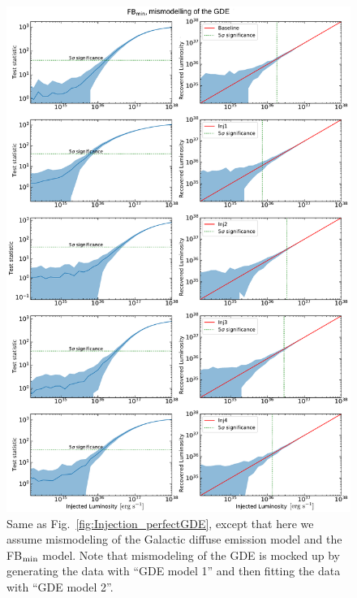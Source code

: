 \documentclass[doublespace,draft,nopageskip]{VTthesis} %
\begin{document}
\begin{figure}
    \begin{center}
    \includegraphics[scale = 0.42]{Figures/CTA/all-TS-mis-True-Fermi-min-True.pdf}
    \caption{Same as Fig.~\ref{fig:Injection_perfectGDE}, except that here we assume mismodeling of the Galactic diffuse emission model and the FB$_{\rm min}$ model. Note that mismodeling of the GDE is mocked up by generating the data with ``GDE model 1'' and then fitting the data with ``GDE model 2''. }\label{fig:InjectionmismodelingFBmin}
    \end{center}
    \end{figure}
\end{document}
